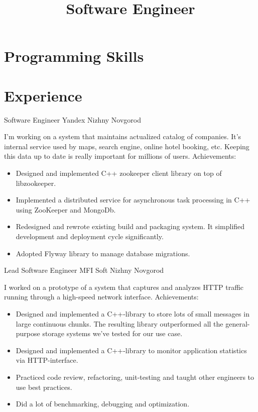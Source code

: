 \documentclass[11pt,a4paper,sans]{moderncv}
\title{Software Engineer}
\begin{document}
\makecvtitle

\section{Programming Skills}

\section{Experience}
{Software Engineer}
{Yandex}
{Nizhny Novgorod}
{}
{I'm working on a system that maintains actualized catalog of
companies.  It's internal service used by maps, search engine, online
hotel booking, etc.  Keeping this data up to date is really important
for millions of users.
\newline{}
Achievements:
\begin{itemize}
\item Designed and implemented C++ zookeeper client library on top of
  libzookeeper.
\item Implemented a distributed service for asynchronous task
  processing in C++ using ZooKeeper and MongoDb.
\item Redesigned and rewrote existing build and packaging system. It
  simplified development and deployment cycle significantly.
\item Adopted Flyway library to manage database migrations.
\end{itemize}
}

{Lead Software Engineer}
{MFI Soft}
{Nizhny Novgorod}
{}
{I worked on a prototype of a system that captures and analyzes HTTP
traffic running through a high-speed network interface.
\newline{}
Achievements:
\begin{itemize}
\item Designed and implemented a C++-library to store lots of small
  messages in large continuous chunks. The resulting library
  outperformed all the general-purpose storage systems we've tested
  for our use case.
\item Designed and implemented a C++-library to monitor application
  statistics via HTTP-interface.
\item Practiced code review, refactoring, unit-testing and taught
  other engineers to use best practices.
\item Did a lot of benchmarking, debugging and optimization.
\end{itemize}
}
\end{document}
